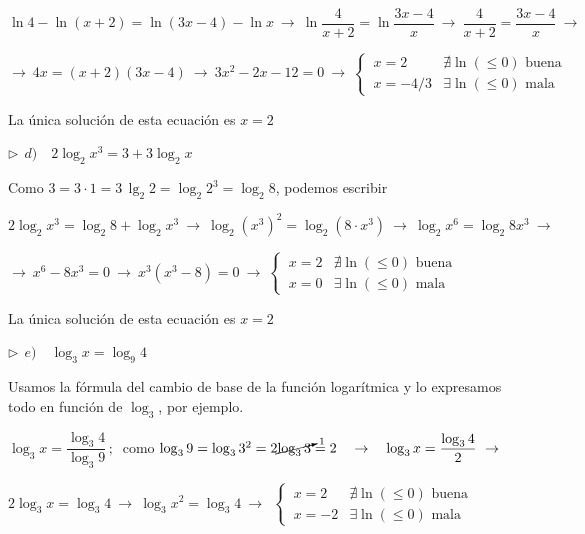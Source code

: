 \begin{miejercicio}
\vspace{2mm} $  \ln 4-\ln(x+2)=\ln(3x-4)-\ln x \ \to \ \ln \dfrac{4}{x+2}=\ln \dfrac {3x-4}{x}\ \to \ \dfrac{4}{x+2}=\dfrac{3x-4}{x}\ \to$

\vspace{2mm} $\to \ 4x=(x+2)(3x-4) \ \to \ 3x^2-2x-12=0 \ \to \ \begin{cases}
 \ x=2 &  \nexists \ln(\le 0) \text{ buena}  \\ \ x=-4/3 &	\exists \ln(\le 0) \text{ mala}
 \end{cases}$
 
 \vspace{2mm} La única solución de esta ecuación es $x=2$


\vspace{5mm} $\triangleright \ \ d) \quad  2\log_2 x^3=3+3\log_2 x$

\vspace{2mm} Como $3=3\cdot 1=3\, \lg_2 2=\log_2 2^3=\log_2 8$, podemos escribir

\vspace{2mm} $ 2\log_2 x^3=\log_2 8+\log_2 x^3 \ \to \ \log_2 (x^3)^2=\log_2 (8\cdot x^3) \ \to \ \log_2 x^6=\log_2 8x^3 \ \to $

\vspace{2mm}$\to \ x^6-8x^3=0 \ \to \ x^3(x^3-8)=0 \ \to  \ \begin{cases}
 \ x=2 &  \nexists \ln(\le 0) \text{ buena}  \\ 
 \ x=0 &	\exists \ln(\le 0) \text{ mala}	
 \end{cases}$

\vspace{2mm} La única solución de esta ecuación es $x=2$

\vspace{5mm} $\triangleright \ \ e) \quad  \log_3 x=\log_9 4$


\vspace{2mm} Usamos la fórmula del cambio de base de la función logarítmica y lo expresamos todo en función de $\log_3$, por ejemplo.

\vspace{2mm} $\log_3 x=\dfrac{\log_3 4}{\log_3 9}\, ; \ $ como $\log_39=\log_33^2=2\cancelto{1}{\log_3 3}=2\quad \to \quad \log_3 x=\dfrac{\log_3 4}{2} \ \to \ $

\vspace{2mm} $2\log_3 x=\log_3 4 \ \to \ \log_3 x^2=\log_3 4 \ \to \  \ \begin{cases}
 \ x=2 &  \nexists \ln(\le 0) \text{ buena}  \\ 
 \ x=-2 &	\exists \ln(\le 0) \text{ mala}	
 \end{cases}$


\end{miejercicio}

